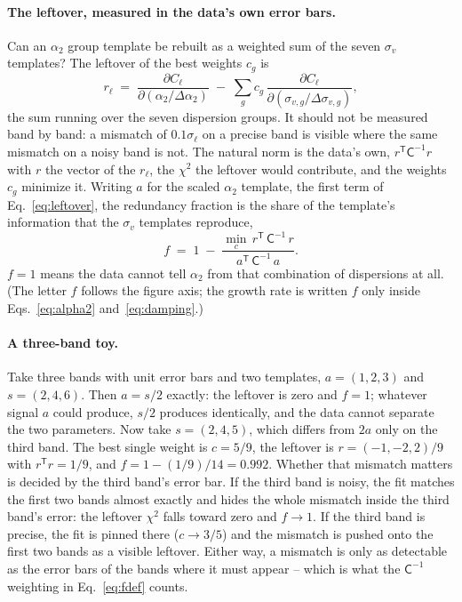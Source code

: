 \documentclass[11pt]{article}
\newcommand{\Cov}{\mathsf{C}}
\newcommand{\T}{^{\mathsf{T}}}
\newcommand{\sv}{\sigma_v}
\begin{document}
\paragraph{The leftover, measured in the data's own error bars.}
Can an $\alpha_2$ group template be rebuilt as a weighted sum of the
seven $\sv$ templates?  The leftover of the best weights $c_g$ is
\begin{equation}
  r_\ell \;=\; \frac{\partial C_\ell}{\partial(\alpha_2/\Delta\alpha_2)}
  \;-\; \sum_{g} c_g\,
  \frac{\partial C_\ell}{\partial(\sigma_{v,g}/\Delta\sigma_{v,g})} ,
  \label{eq:leftover}
\end{equation}
the sum running over the seven dispersion groups.  It should not be
measured band by band: a mismatch of $0.1\sigma_\ell$ on a precise
band is visible where the same mismatch on a noisy band is not.  The
natural norm is the data's own, $r\T \Cov^{-1} r$ with $r$ the vector
of the $r_\ell$, the $\chi^2$ the leftover would contribute, and the
weights $c_g$ minimize it.  Writing $a$ for the scaled $\alpha_2$
template, the first term of Eq.~\eqref{eq:leftover}, the redundancy
fraction is the share of the template's information that the $\sv$
templates reproduce,
\begin{equation}
  f \;=\; 1 \;-\; \frac{\min_c\, r\T\, \Cov^{-1}\, r}
  {a\T\, \Cov^{-1}\, a} .
  \label{eq:fdef}
\end{equation}
$f = 1$ means the data cannot tell $\alpha_2$ from that combination of
dispersions at all.  (The letter $f$ follows the figure axis; the
growth rate is written $f$ only inside
Eqs.~\eqref{eq:alpha2} and~\eqref{eq:damping}.)

\paragraph{A three-band toy.}
Take three bands with unit error bars and two templates,
$a = (1, 2, 3)$ and $s = (2, 4, 6)$.  Then $a = s/2$ exactly: the
leftover is zero and $f = 1$; whatever signal $a$ could produce, $s/2$
produces identically, and the data cannot separate the two parameters.
Now take $s = (2, 4, 5)$, which differs from $2a$ only on the third
band.  The best single weight is $c = 5/9$, the leftover is
$r = (-1, -2, 2)/9$ with $r\T r = 1/9$, and
$f = 1 - (1/9)/14 = 0.992$.  Whether that mismatch matters is decided
by the third band's error bar.  If the third band is noisy, the fit
matches the first two bands almost exactly and hides the whole
mismatch inside the third band's error: the leftover $\chi^2$ falls
toward zero and $f \to 1$.  If the third band is precise, the fit is
pinned there ($c \to 3/5$) and the mismatch is pushed onto the first
two bands as a visible leftover.  Either way, a mismatch is only as
detectable as the error bars of the bands where it must appear --
which is what the $\Cov^{-1}$ weighting in Eq.~\eqref{eq:fdef} counts.
\end{document}
